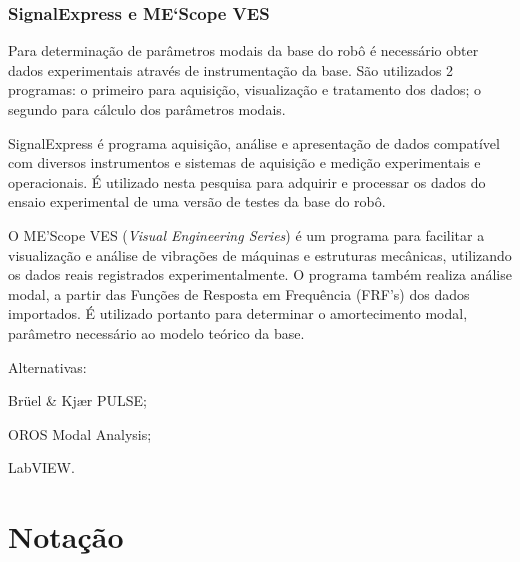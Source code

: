 \subsubsection{SignalExpress e ME`Scope VES}

Para determinação de parâmetros modais da base do robô é necessário obter dados
experimentais através de instrumentação da base. São utilizados 2 programas: o
primeiro para aquisição, visualização e tratamento dos dados; o segundo para
cálculo dos parâmetros modais.

SignalExpress\cite{signalexpress} é programa aquisição, análise e
apresentação de dados compatível com diversos instrumentos e sistemas de
aquisição e medição experimentais e operacionais. 
É utilizado nesta pesquisa para adquirir e processar os dados do ensaio
experimental de uma versão de testes da base do robô.

O ME'Scope VES (\textit{Visual Engineering Series})\cite{mescope} é um programa
para facilitar a visualização e análise de vibrações de máquinas e estruturas
mecânicas, utilizando os dados reais registrados experimentalmente. O programa
também realiza análise modal, a partir das Funções de Resposta em Frequência
(FRF's) dos dados importados. É utilizado portanto para  determinar o
amortecimento modal, parâmetro necessário ao modelo teórico da base.

Alternativas:
%
\begin{enumerate*}
	\item Brüel \& Kjær PULSE;
	\item OROS Modal Analysis;
	\item LabVIEW.
\end{enumerate*}

\section{Notação}

